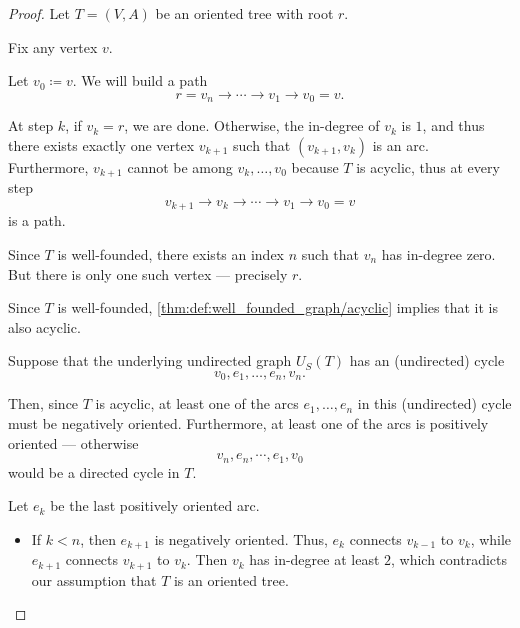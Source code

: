 \begin{proof}
   Let \( T = (V, A) \) be an oriented tree with root \( r \).

   Fix any vertex \( v \).

  Let \( v_0 \coloneqq v \). We will build a path
  \begin{equation*}
    r = v_n \to \cdots \to v_1 \to v_0 = v.
  \end{equation*}

  At step \( k \), if \( v_k = r \), we are done. Otherwise, the in-degree of \( v_k \) is \( 1 \), and thus there exists exactly one vertex \( v_{k+1} \) such that \( (v_{k+1}, v_k) \) is an arc. Furthermore, \( v_{k+1} \) cannot be among \( v_k, \ldots, v_0 \) because \( T \) is acyclic, thus at every step
  \begin{equation*}
    v_{k+1} \to v_k \to \cdots \to v_1 \to v_0 = v
  \end{equation*}
  is a path.

  Since \( T \) is well-founded, there exists an index \( n \) such that \( v_n \) has in-degree zero. But there is only one such vertex --- precisely \( r \).

   Since \( T \) is well-founded, \cref{thm:def:well_founded_graph/acyclic} implies that it is also acyclic.

  Suppose that the underlying undirected graph \( U_S(T) \) has an (undirected) cycle
  \begin{equation*}
    v_0, e_1, \ldots, e_n, v_n.
  \end{equation*}

  Then, since \( T \) is acyclic, at least one of the arcs \( e_1, \ldots, e_n \) in this (undirected) cycle must be negatively oriented. Furthermore, at least one of the arcs is positively oriented --- otherwise
  \begin{equation*}
    v_n, e_n, \cdots, e_1, v_0
  \end{equation*}
  would be a directed cycle in \( T \).

  Let \( e_k \) be the last positively oriented arc.
  \begin{itemize}
    \item If \( k < n \), then \( e_{k+1} \) is negatively oriented. Thus, \( e_k \) connects \( v_{k-1} \) to \( v_k \), while \( e_{k+1} \) connects \( v_{k+1} \) to \( v_k \). Then \( v_k \) has in-degree at least \( 2 \), which contradicts our assumption that \( T \) is an oriented tree.


\end{itemize}
\end{proof}
